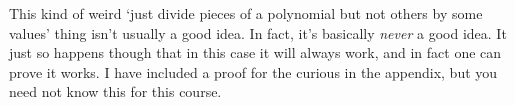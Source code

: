 \documentclass{ximeraXloud}
\begin{document}
    This kind of weird `just divide pieces of a polynomial but not others by some values' thing isn't usually a good idea. In fact, it's basically \textit{never} a good idea. It just so happens though that in this case it will always work, and in fact one can prove it works. I have included a proof for the curious in the appendix, but you need not know this for this course.
\end{document}
